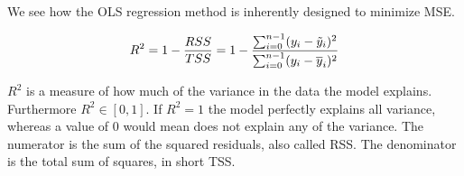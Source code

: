 We see how the OLS regression method is inherently designed to minimize MSE.

\begin{equation}
    R^2 = 1 - \frac{RSS}{TSS}= 1 - \frac{\sum_{i=0}^{n-1}(y_i-\Tilde{y}_i)^2}{\sum_{i=0}^{n-1}(y_i-\overline{y}_i)^2}
\end{equation}

$R^2$ is a measure of how much of the variance in the data the model explains. %
Furthermore $R^2 \in [0,1]$. If $R^2 = 1$ the model perfectly explains all variance, whereas a value of 0 would mean does not explain any of the variance. The numerator is the sum of the squared residuals, also called RSS. The denominator is the total sum of squares, in short TSS. 


